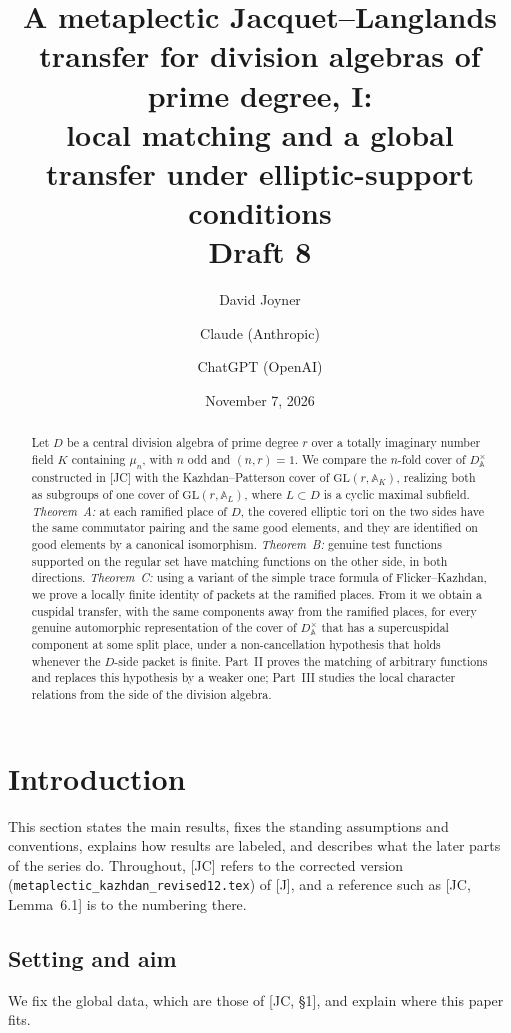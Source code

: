 \documentclass[12pt]{article}
\title{A metaplectic Jacquet--Langlands transfer for division algebras of prime degree, I:\\ local matching and a global transfer under elliptic-support conditions\\[0.4em]\normalsize Draft 8}
\author{David Joyner \and Claude (Anthropic) \and ChatGPT (OpenAI)}
\date{November 7, 2026}
\newcommand{\A}{\mathbb{A}}
\newcommand{\GL}{\mathrm{GL}}
\theoremstyle{plain}
\theoremstyle{definition}
\begin{document}
\maketitle

\begin{abstract}
Let $D$ be a central division algebra of prime degree $r$ over a totally imaginary number field $K$ containing $\mu_n$, with $n$ odd and $(n,r)=1$. We compare the $n$-fold cover of $D^\times_{\A}$ constructed in [JC] with the Kazhdan--Patterson cover of $\GL(r,\A_K)$, realizing both as subgroups of one cover of $\GL(r,\A_L)$, where $L\subset D$ is a cyclic maximal subfield. \emph{Theorem~A:} at each ramified place of $D$, the covered elliptic tori on the two sides have the same commutator pairing and the same good elements, and they are identified on good elements by a canonical isomorphism. \emph{Theorem~B:} genuine test functions supported on the regular set have matching functions on the other side, in both directions. \emph{Theorem~C:} using a variant of the simple trace formula of Flicker--Kazhdan, we prove a locally finite identity of packets at the ramified places. From it we obtain a cuspidal transfer, with the same components away from the ramified places, for every genuine automorphic representation of the cover of $D^\times_{\A}$ that has a supercuspidal component at some split place, under a non-cancellation hypothesis that holds whenever the $D$-side packet is finite. Part~II proves the matching of arbitrary functions and replaces this hypothesis by a weaker one; Part~III studies the local character relations from the side of the division algebra.
\end{abstract}

\tableofcontents

\section{Introduction}\label{sec:intro}
This section states the main results, fixes the standing assumptions and conventions, explains how results are labeled, and describes what the later parts of the series do. Throughout, [JC] refers to the corrected version (\texttt{metaplectic\_kazhdan\_revised12.tex}) of [J], and a reference such as [JC, Lemma~6.1] is to the numbering there.

\subsection{Setting and aim}
We fix the global data, which are those of [JC, \S1], and explain where this paper fits.
\end{document}
